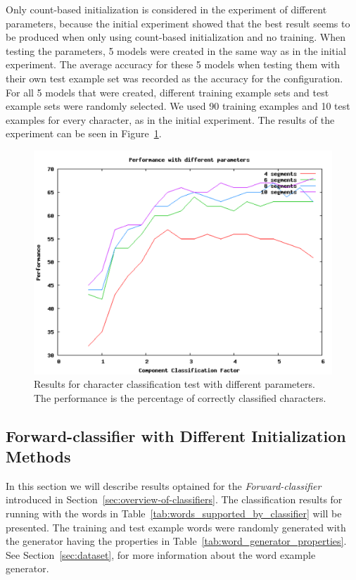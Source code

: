Only count-based initialization is considered in the experiment of different parameters, because the initial experiment showed that the best result seems to be produced when only using count-based initialization and no training.
When testing the parameters, 5 models were created in the same way as in the initial experiment. 
The average accuracy for these 5 models when testing them with their own test example set was recorded as the accuracy for the configuration. 
For all 5 models that were created, different training example sets and test example sets were randomly selected. 
We used 90 training examples and 10 test examples for every character, as in the initial experiment. 
The results of the experiment can be seen in Figure~\ref{figure:charater-results-parameters}.

\begin{figure}[h!]
\centering
\includegraphics[scale=0.57]{ccf-nos}
\caption{Results for character classification test with different parameters. The performance is the percentage of correctly classified characters.}
\label{figure:charater-results-parameters}
\end{figure}

\subsection{Forward-classifier with Different Initialization Methods}\label{sec:word_classifier_results}
In this section we will describe results optained for the \emph{Forward-classifier} introduced in Section~\ref{sec:overview-of-classifiers}.
The classification results for running with the words in Table~\ref{tab:words_supported_by_classifier} will be presented. 
The training and test example words were randomly generated with the generator having the properties in Table~\ref{tab:word_generator_properties}.
See Section~\ref{sec:dataset}, for more information about the word example generator. 

